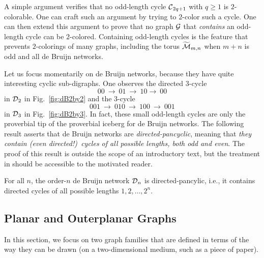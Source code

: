 A simple argument verifies that no odd-length cycle $\mbox{$\cal C$}_{2q+1}$ with
$q \geq 1$ is $2$-colorable.  One can craft such an argument by trying to $2$-color
such a cycle.  One can then extend this argument to prove that no graph $\mbox{$\cal G$}$
that {\em contains} an odd-length cycle can be $2$-colored.
Containing odd-length cycles is the feature that prevents $2$-colorings of many graphs, 
including the torus $\widetilde{\mbox{$\cal M$}}_{m,n}$ when $m+n$ is odd and all de Bruijn networks.

Let us focus momentarily on de Bruijn networks, because they have quite interesting
cyclic sub-digraphs.  One observes the directed $3$-cycle
\[ 00 \ \rightarrow \ 01 \ \rightarrow \ 10  \rightarrow \ 00 \]
in $\mbox{$\cal D$}_2$ in Fig.~\ref{fig:dB2by2} and the $3$-cycle
\[ 001 \ \rightarrow \ 010 \ \rightarrow \ 100 \ \rightarrow \ 001 \]
in $\mbox{$\cal D$}_3$ in Fig.~\ref{fig:dB2by3}.  In fact, these small odd-length cycles are only the
proverbial tip of the proverbial iceberg for de Bruijn networks.  The following result
asserts that de Bruijn networks are {\it directed-pancyclic}, meaning that 
{\em they contain (even directed!)~cycles of {\em all} possible lengths, both odd and even}.
The proof of this result is outside the scope of an introductory text, but the treatment
in \cite{Yoeli62} should be accessible to the motivated reader.


\begin{prop}{\cite{Yoeli62}}
For all $n$, the order-$n$ de Bruijn network $\mbox{$\cal D$}_n$ is directed-pancylic, i.e., it
contains directed cycles of all possible lengths $1, 2, \ldots, 2^n$.
\end{prop}

\subsection{Planar and Outerplanar Graphs}
\label{sec:planar+outerplanar-color}

In this section, we focus on two graph families that are defined in
terms of the way they can be drawn (on a two-dimensional medium, such
as a piece of paper).
\bigskip

\noindent {}
\bigskip

